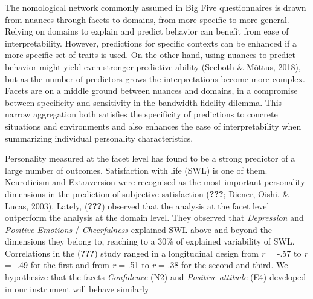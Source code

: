 \documentclass[,man,floatsintext]{apa6}
\theoremstyle{definition}
\theoremstyle{definition}
\theoremstyle{definition}
\theoremstyle{remark}
\begin{document}
The nomological network commonly assumed in Big Five questionnaires is
drawn from nuances through facets to domains, from more specific to more
general. Relying on domains to explain and predict behavior can benefit
from ease of interpretability. However, predictions for specific
contexts can be enhanced if a more specific set of traits is used. On
the other hand, using nuances to predict behavior might yield even
stronger predictive ability (Seeboth \& Mõttus, 2018), but as the number
of predictors grows the interpretations become more complex. Facets are
on a middle ground between nuances and domains, in a compromise between
specificity and sensitivity in the bandwidth-fidelity dilemma. This
narrow aggregation both satisfies the specificity of predictions to
concrete situations and environments and also enhances the ease of
interpretability when summarizing individual personality
characteristics.

Personality measured at the facet level has found to be a strong
predictor of a large number of outcomes. Satisfaction with life (SWL) is
one of them. Neuroticism and Extraversion were recognised as the most
important personality dimensions in the prediction of subjective
satisfaction ({\textbf{???}}; Diener, Oishi, \& Lucas, 2003). Lately,
({\textbf{???}}) observed that the analysis at the facet level
outperform the analysis at the domain level. They observed that
\emph{Depression} and \emph{Positive Emotions} / \emph{Cheerfulness}
explained SWL above and beyond the dimensions they belong to, reaching
to a 30\% of explained variability of SWL. Correlations in the
({\textbf{???}}) study ranged in a longitudinal design from \emph{r} =
-.57 to \emph{r} = -.49 for the first and from \emph{r} = .51 to
\emph{r} = .38 for the second and third. We hypothesize that the facets
\emph{Confidence} (N2) and \emph{Positive attitude} (E4) developed in
our instrument will behave similarly
\end{document}
